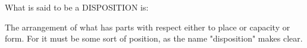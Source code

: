 
What is said to be a DISPOSITION is:

The arrangement of what has parts with respect either to
place or capacity or form. For it must be some sort of position,
as the name "disposition" makes clear.
